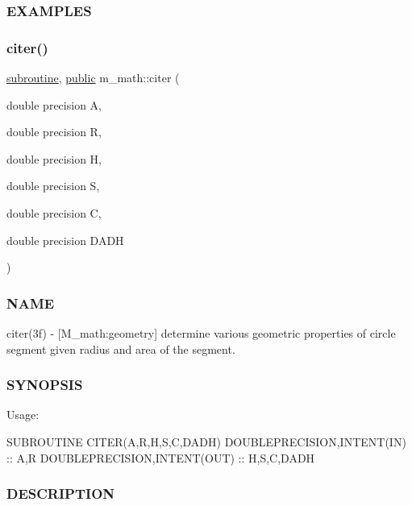  \subsubsection*{E\+X\+A\+M\+P\+L\+ES}\mbox{\label{namespacem__math_a14a1fd06462e345989ff976aac03f18d}} 
\subsubsection{\texorpdfstring{citer()}{citer()}}
{\footnotesize\ttfamily \hyperlink{M__stopwatch_83_8txt_acfbcff50169d691ff02d4a123ed70482}{subroutine}, \hyperlink{M__stopwatch_83_8txt_a2f74811300c361e53b430611a7d1769f}{public} m\+\_\+math\+::citer (\begin{DoxyParamCaption}\item[{double precision}]{A,  }\item[{double precision}]{R,  }\item[{double precision}]{H,  }\item[{double precision}]{S,  }\item[{double precision}]{C,  }\item[{double precision}]{D\+A\+DH }\end{DoxyParamCaption})}



\subsubsection*{N\+A\+ME}

citer(3f) -\/ \mbox{[}M\+\_\+math\+:geometry\mbox{]} determine various geometric properties of circle segment given radius and area of the segment. \subsubsection*{S\+Y\+N\+O\+P\+S\+IS}

Usage\+:

S\+U\+B\+R\+O\+U\+T\+I\+NE C\+I\+T\+E\+R(\+A,\+R,\+H,\+S,\+C,\+D\+A\+D\+H) D\+O\+U\+B\+L\+E\+P\+R\+E\+C\+I\+S\+I\+ON,I\+N\+T\+E\+N\+T(\+I\+N) \+:\+: A,R D\+O\+U\+B\+L\+E\+P\+R\+E\+C\+I\+S\+I\+ON,I\+N\+T\+E\+N\+T(\+O\+U\+T) \+:\+: H,S,C,D\+A\+DH

\subsubsection*{D\+E\+S\+C\+R\+I\+P\+T\+I\+ON}

